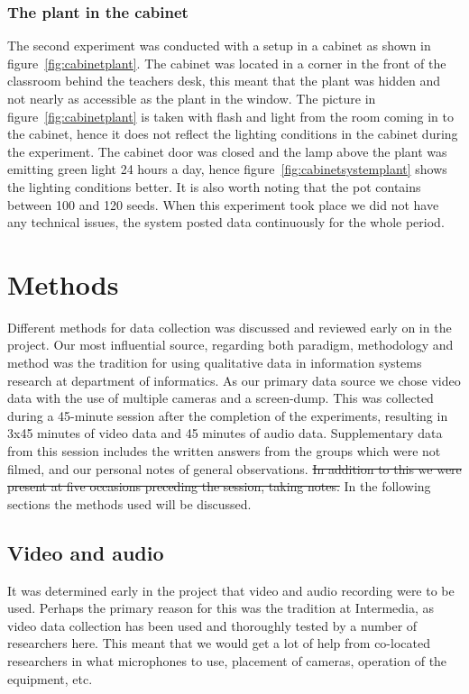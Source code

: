 \subsubsection*{The plant in the cabinet}
The second experiment was conducted with a setup in a cabinet as shown in figure~\ref{fig:cabinetplant}. The cabinet was located in a corner in the front of the classroom behind the teachers desk, this meant that the plant was hidden and not nearly as accessible as the plant in the window. The picture in figure~\ref{fig:cabinetplant} is taken with flash and light from the room coming in to the cabinet, hence it does not reflect the lighting conditions in the cabinet during the experiment. The cabinet door was closed and the lamp above the plant was emitting green light 24 hours a day, hence figure~\ref{fig:cabinetsystemplant} shows the lighting conditions better. It is also worth noting that the pot contains between 100 and 120 seeds. When this experiment took place we did not have any technical issues, the system posted data continuously for the whole period.


\section{Methods}
Different methods for data collection was discussed and reviewed early on in the project. Our most influential source, regarding both paradigm, methodology and method was the tradition for using qualitative data in information systems research at department of informatics. As our primary data source we chose video data with the use of multiple cameras and a screen-dump. This was collected during a 45-minute session after the completion of the experiments, resulting in 3x45 minutes of video data and 45 minutes of audio data. Supplementary data from this session includes the written answers from the groups which were not filmed, and our personal notes of general observations. \sout{In addition to this we were present at five occasions preceding the session, taking notes. } In the following sections the methods used will be discussed. 

\subsection{Video and audio}
It was determined early in the project that video and audio recording were to be used. Perhaps the primary reason for this was the tradition at Intermedia, as video data collection has been used and thoroughly tested by a number of researchers here. This meant that we would get a lot of help from co-located researchers in what microphones to use, placement of cameras, operation of the equipment, etc. 

